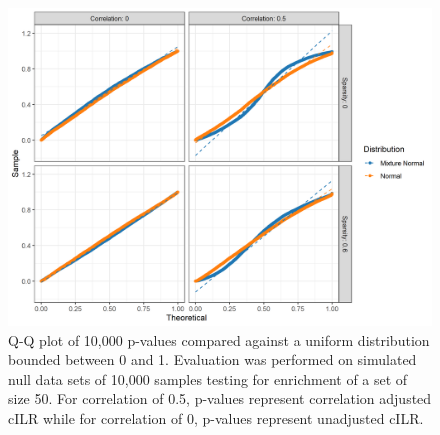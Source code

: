 \begin{figure}[!ht]
    \centering
    \includegraphics[width=\textwidth]{figures/pval_distr.png}
    \caption{Q-Q plot of 10,000 p-values compared against a uniform distribution bounded between 0 and 1. Evaluation was performed on simulated null data sets of 10,000 samples testing for enrichment of a set of size 50. For correlation of 0.5, p-values represent correlation adjusted cILR while for correlation of 0, p-values represent unadjusted cILR.}
    \label{fig:s7}
\end{figure}